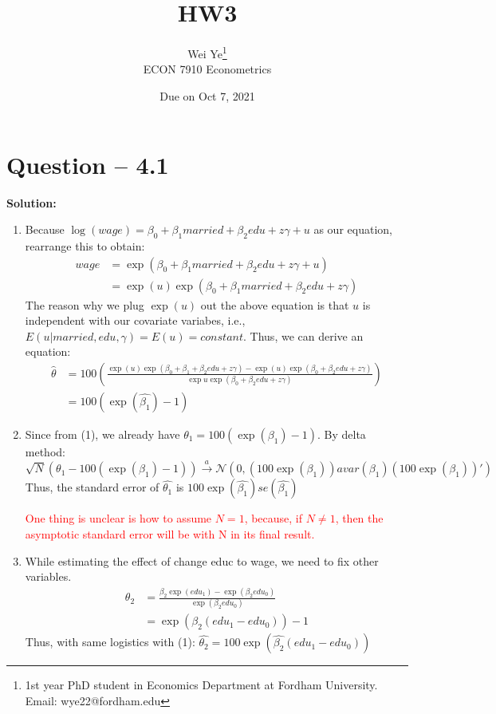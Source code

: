 \documentclass[11pt]{article} %
\title{HW3}
\author{Wei Ye\footnote{ 1st year PhD student in Economics Department at Fordham University. Email: wye22@fordham.edu}
    \\ ECON 7910 Econometrics}
\date{Due on Oct 7, 2021}
\begin{document}
	\maketitle

\section{Question -- 4.1}
\textbf{Solution:}
\begin{enumerate}
    \item Because $\log(wage)=\beta_0+\beta_1married+\beta_2edu+z\gamma+u$ as our equation, rearrange this to obtain:
          \begin{align*}
              wage&=\exp(\beta_0+\beta_1married+\beta_2edu+z\gamma+u)\\
                  &= \exp(u)\exp(\beta_0+\beta_1married+\beta_2edu+z\gamma)
          \end{align*}
          The reason why we plug $\exp(u)$ out the above equation is that $u$ is independent with our covariate variabes, i.e.,
          $E(u|married,edu,\gamma)=E(u)=constant$. Thus, we can derive an equation:
          \begin{align*}
              \hat{\theta}&=100(\frac{\exp(u)\exp(\beta_0+\beta_1+\beta_2edu+z\gamma)-\exp(u)\exp(\beta_0+\beta_2edu+z\gamma)}{\exp{u}\exp(\beta_0+\beta_2edu+z\gamma)})\\
                          &= 100(\exp(\hat{\beta_1})-1)
          \end{align*}
    \item Since from (1), we already have $\theta_1=100(\exp(\beta_1)-1)$. By delta method:
        \begin{equation*}
            \sqrt{N}(\theta_1-100(\exp(\beta_1)-1))\xrightarrow{a} \mathcal{N}(0,(100\exp(\beta_1))avar(\beta_1)(100\exp(\beta_1))')
        \end{equation*}
        Thus, the standard error of $\hat{\theta_1}$ is $100\exp(\hat{\beta_1})se(\hat{\beta_1})$

        \textcolor{red}{One thing is unclear is how to assume $N=1$, because, if $N\neq 1$, then the asymptotic standard error will be with N in its final result.}
    \item While estimating the effect of change educ to wage, we need to fix other variables. 
      \begin{align*}
          \theta_2&=\frac{\beta_2\exp(edu_1)-\exp(\beta_2edu_0)}{\exp(\beta_2edu_0)}\\
                  &= \exp(\beta_2(edu_1-edu_0))-1
      \end{align*}
      Thus, with same logistics with (1): $\hat{\theta_2}=100\exp(\hat{\beta_2}(edu_1-edu_0))$


\end{enumerate}
\end{document}
